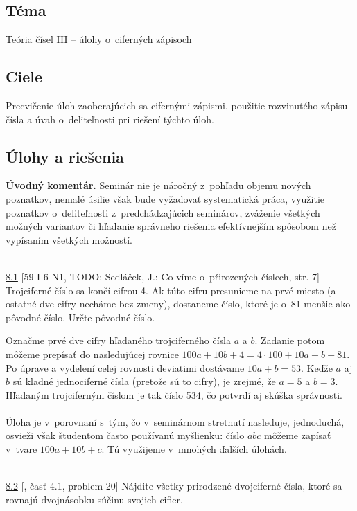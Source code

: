 

\subsection*{Téma}
Teória čísel III -- úlohy o~ciferných zápisoch
\subsection*{Ciele}
Precvičenie úloh zaoberajúcich sa cifernými zápismi, použitie rozvinutého zápisu čísla a úvah o~deliteľnosti pri riešení týchto úloh.

\subsection*{Úlohy a riešenia}

\textbf{Úvodný komentár.} Seminár nie je náročný z~pohľadu objemu nových poznatkov, nemalé úsilie však bude vyžadovať systematická práca, využitie poznatkov o~deliteľnosti z~predchádzajúcich seminárov, zváženie všetkých možných variantov či hľadanie správneho riešenia efektívnejším spôsobom než vypísaním všetkých možností.\\
\\
\begin{tcolorbox}[breakable,notitle,boxrule=0pt,colback=light-gray,colframe=light-gray]\ul{8.1} [59-I-6-N1, TODO: Sedláček, J.: Co víme o~přirozených číslech, str. 7] Trojciferné číslo sa končí cifrou 4. Ak túto cifru presunieme na prvé miesto (a ostatné dve cifry necháme bez zmeny), dostaneme číslo, ktoré je o~81 menšie ako pôvodné číslo. Určte pôvodné číslo.

\end{tcolorbox}

\rie Označme prvé dve cifry hľadaného trojciferného čísla $a$ a $b$. Zadanie potom môžeme prepísať do nasledujúcej rovnice $100a+10b+4=4\cdot 100 + 10a+b+81$. Po úprave a vydelení celej rovnosti deviatimi dostávame $10a+b=53$. Keďže $a$ aj $b$ sú kladné jednociferné čísla (pretože sú to cifry), je zrejmé, že $a=5$ a $b=3$. Hľadaným trojciferným číslom je tak číslo 534, čo potvrdí aj skúška správnosti. \\
\\
\kom Úloha je v~porovnaní s~tým, čo v~seminárnom stretnutí nasleduje, jednoduchá, osvieži však študentom často používanú myšlienku: číslo $\overline{abc}$ môžeme zapísať v~tvare $100a+10b+c$. Tú využijeme v~mnohých ďalších úlohách.\\
\\
\begin{tcolorbox}[breakable,notitle,boxrule=0pt,colback=light-gray,colframe=light-gray]\ul{8.2} [\cite{holton2010}, časť 4.1, problem 20] Nájdite všetky prirodzené dvojciferné čísla, ktoré sa rovnajú dvojnásobku súčinu svojich cifier.

\end{tcolorbox}

